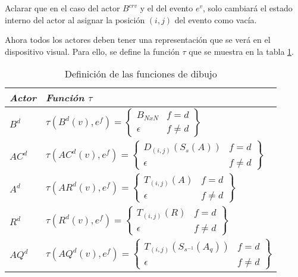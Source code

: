 \documentclass{egpubl}
\begin{document}
Aclarar que en el caso del actor $B^{crv}$ y el del evento $e^{v}$, solo
cambiar\'a el estado interno del actor al asignar la posici\'on $(i,j)$
del evento como vac\'ia.

Ahora todos los actores deben tener una representaci\'on que se ver\'a
en el dispositivo visual. Para ello, se define la funci\'on
$\tau$ que se muestra en la tabla \ref{table4}.




\begin{table}[h]
\begin{center}
\begin{small}
\begin{tabular}{|l|l|}
	
	\hline
	\itshape Actor &
	\itshape Funci\'on ${\tau}$ \\

	\hline
	$B^{d}$ &
	$\tau (B^{d}(v),e^{f}) = \left\{
	\begin{matrix}
		B_{NxN}  &  f = d \\
		\epsilon & f \neq d
	\end{matrix}\right\}$	\\

	\hline
	$AC^{d}$ &
	$\tau (AC^{d}(v), e^{f}) = \left\{
	\begin{matrix}
		D_{(i,j)}(S_{s}(A))  &  f = d \\
		\epsilon  & f \neq d
	\end{matrix}\right\}$ 	\\

	\hline
	$A^{d}$ &
	$\tau (AR^{d}(v), e^{f}) = \left\{
	\begin{matrix}
		T_{(i,j)}(A)  &  f = d \\
		\epsilon  &  f \neq d
	\end{matrix}\right\}$ 	\\

	\hline
	$R^{d}$ &
	$\tau (R^{d}(v), e^{f}) = \left\{
	\begin{matrix}
		T_{(i,j)}(R)   &  f = d \\
		\epsilon  &  f \neq d
	\end{matrix}\right\}$	\\

	\hline
	$AQ^{d}$ &
	$\tau (AQ^{d}(v), e^{f}) = \left\{
	\begin{matrix}
		T_{(i,j)}(S_{s^{-1}}(A_{q}))   &   f = d \\
		\epsilon  &  f \neq d
	\end{matrix}\right\}$	\\

	\hline
\end{tabular}
\end{small}
\caption{\label{table4} Definici\'on de las funciones de dibujo}
\end{center}
\end{table}
\end{document}
